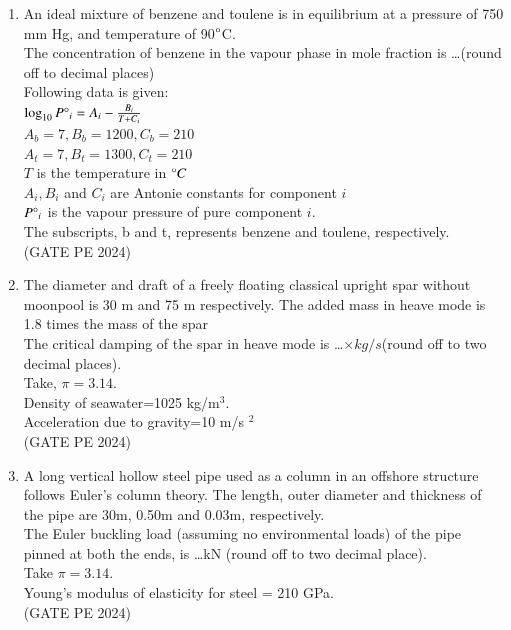 \documentclass[journal,12pt,onecolumn]{IEEEtran}
\theoremstyle{remark}
\begin{document}
\begin{enumerate}
\item An ideal mixture of benzene and toulene is in equilibrium at a pressure of 750 mm Hg, and temperature of 90$\degree$C.\\
The concentration of benzene in the vapour phase in mole fraction is \dots (round off to decimal places)\\
Following data is given:\\
$\log_{10}P\degree_i=A_i-\frac{B_i}{T+C_i}$\\
$A_b=7, B_b=1200, C_b=210$\\
$A_t=7, B_t=1300, C_t=210$\\
$T$ is the temperature in $\degree C$\\
$A_i, B_i$ and $C_i$ are Antonie constants for component $i$\\
$P\degree _i$ is the vapour pressure of pure component $i$.\\
The subscripts, b and t, represents benzene and toulene, respectively.\\

\hfill{(GATE PE 2024)}

\item The diameter and draft of a freely floating classical upright spar without moonpool is 30 m and 75 m respectively. The added mass in heave mode is 1.8 times the mass of the spar\\
The critical damping of the spar in heave mode is \dots $\times kg/s$(round off to two decimal places).\\
Take, $\pi=3.14$.\\
Density of seawater=1025 kg/m$^3$.\\
Acceleration due to gravity=10 m/s $^2$\\

\hfill{(GATE PE 2024)}

\item A long vertical hollow steel pipe used as a column in an offshore structure follows Euler's column theory. The length, outer diameter and thickness of the pipe are 30m, 0.50m and 0.03m, respectively.\\
The Euler buckling load (assuming no environmental loads) of the pipe pinned at both the ends, is \dots kN (round off to two decimal place).\\
Take $\pi=3.14$.\\
Young's modulus of elasticity for steel = 210 GPa.\\

\hfill{(GATE PE 2024)}


\end{enumerate}
\end{document}
